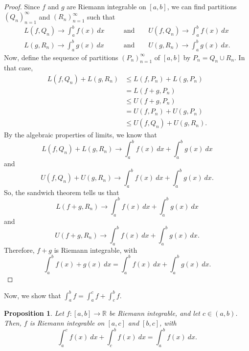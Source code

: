 \documentclass[a4paper, openany]{memoir}
\theoremstyle{definition}
\theoremstyle{plain}
\newtheorem{proposition}[definition]{Proposition}
\begin{document}
\begin{proof}
Since $f$ and $g$ are Riemann integrable on $[a, b]$, we can find partitions $(Q_n)_{n=1}^\infty$ and $(R_n)_{n=1}^\infty$ such that
\begin{align*}
    L(f, Q_n) \to \int_a^b f(x) \ dx \qquad &\text{and} \qquad U(f, Q_n) \to \int_a^b f(x) \ dx \\
    L(g, R_n) \to \int_a^b g(x) \ dx \qquad &\text{and} \qquad U(g, R_n) \to \int_a^b g(x) \ dx.
\end{align*}
Now, define the sequence of partitions $(P_n)_{n=1}^\infty$ of $[a, b]$ by $P_n = Q_n \cup R_n$. In that case,
\begin{align*}
    L(f, Q_n) + L(g, R_n) &\leqslant L(f, P_n) + L(g, P_n) \\
    &= L(f + g, P_n) \\
    &\leqslant U(f + g, P_n) \\
    &= U(f, P_n) + U(g, P_n) \\
    &\leqslant U(f, Q_n) + U(g, R_n).
\end{align*}
By the algebraic properties of limits, we know that
\[L(f, Q_n) + L(g, R_n) \to \int_a^b f(x) \ dx + \int_a^b g(x) \ dx\]
and
\[U(f, Q_n) + U(g, R_n) \to \int_a^b f(x) \ dx + \int_a^b g(x) \ dx.\]
So, the sandwich theorem tells us that
\[L(f + g, R_n)\to \int_a^b f(x) \ dx + \int_a^b g(x) \ dx\]
and
\[U(f + g, R_n)\to \int_a^b f(x) \ dx + \int_a^b g(x) \ dx.\]
Therefore, $f + g$ is Riemann integrable, with
\[\int_a^b f(x) + g(x) \ dx = \int_a^b f(x) \ dx + \int_a^b g(x) \ dx.\]
\end{proof}
\noindent Now, we show that $\int_a^b f = \int_a^c f + \int_c^b f$.
\begin{proposition}
Let $f: [a, b] \to \mathbb{R}$ be Riemann integrable, and let $c \in (a, b)$. Then, $f$ is Riemann integrable on $[a, c]$ and $[b, c]$, with
\[\int_a^c f(x) \ dx + \int_c^b f(x) \ dx = \int_a^b f(x) \ dx.\]
\end{proposition}
\end{document}
